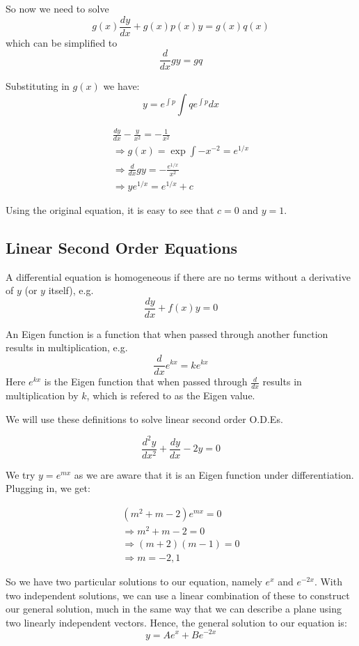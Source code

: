 \documentclass[a4paper,10pt]{article}
\begin{document}
So now we need to solve
\[
	g(x)\frac{dy}{dx} + g(x)p(x)y = g(x)q(x)
\]
which can be simplified to
\[
	\frac{d}{dx} gy = gq
\]

Substituting in $g(x)$ we have:
\[
	y = e^{\int p} \int q e^{\int p} dx
\]

\begin{ex}
	\begin{gather*}
		\frac{dy}{dx} - \frac{y}{x^2} = - \frac{1}{x^2} \\
		\Rightarrow g(x) = \exp{\int -x^{-2}} = e^{1/x} \\
		\Rightarrow \frac{d}{dx} gy = - \frac{e^{1/x}}{x^2} \\
		\Rightarrow y e^{1/x} = e^{1/x} + c
	\end{gather*}

	Using the original equation, it is easy to see that $c=0$ and $y=1$.
\end{ex}

\subsection{Linear Second Order Equations}

\begin{defn}
	A differential equation is homogeneous if there are no terms
	without a derivative of $y$ (or $y$ itself), e.g.
	\[
		\frac{dy}{dx} + f(x)y = 0
	\]
\end{defn}

\begin{defn}
	An Eigen function is a function that when passed through another
	function results in multiplication, e.g.
	\[ \frac{d}{dx} e^{kx} = ke^{kx} \]
	Here $e^{kx}$ is the Eigen function that when passed through
	$\frac{d}{dx}$ results in multiplication by $k$, which is
	refered to as the Eigen value.
\end{defn}

We will use these definitions to solve linear second order O.D.Es.

\begin{ex}
	\[
		\frac{d^2y}{dx^2} + \frac{dy}{dx} - 2y = 0
	\]

	We try $y = e^{mx}$ as we are aware that it is an Eigen function
	under differentiation. Plugging in, we get:

	\begin{gather*}
		(m^2 + m - 2)e^{mx} = 0 \\
		\Rightarrow m^2 + m - 2 = 0 \\
		\Rightarrow (m+2)(m-1) = 0 \\
		\Rightarrow m = -2, 1
	\end{gather*}

	So we have two particular solutions to our equation, namely
	$e^x$ and $e^{-2x}$. With two independent solutions, we can use a
	linear combination of these to construct our general solution, much
	in the same way that we can describe a plane using two linearly
	independent vectors. Hence, the general solution to our equation is:
	\[
		y = Ae^x + Be^{-2x}
	\]
\end{ex}
\end{document}
